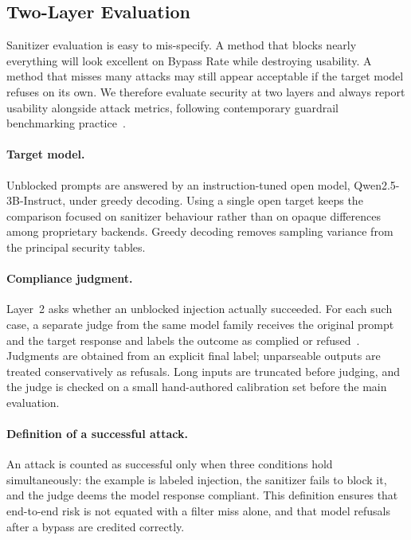 ﻿\documentclass[10pt]{article}
\begin{document}
\subsection{Two-Layer Evaluation}
\label{sec:evaluation}

Sanitizer evaluation is easy to mis-specify.
A method that blocks nearly everything will look excellent on Bypass Rate while destroying usability.
A method that misses many attacks may still appear acceptable if the target model refuses on its own.
We therefore evaluate security at two layers and always report usability alongside attack metrics, following contemporary guardrail benchmarking practice~\cite{zizzo2025adversarial,promptfoo2024owasp}.

\paragraph{Target model.}
Unblocked prompts are answered by an instruction-tuned open model, Qwen2.5-3B-Instruct, under greedy decoding.
Using a single open target keeps the comparison focused on sanitizer behaviour rather than on opaque differences among proprietary backends.
Greedy decoding removes sampling variance from the principal security tables.

\paragraph{Compliance judgment.}
Layer~2 asks whether an unblocked injection actually succeeded.
For each such case, a separate judge from the same model family receives the original prompt and the target response and labels the outcome as complied or refused~\cite{zizzo2025adversarial,yi2024jailbreak}.
Judgments are obtained from an explicit final label; unparseable outputs are treated conservatively as refusals.
Long inputs are truncated before judging, and the judge is checked on a small hand-authored calibration set before the main evaluation.

\paragraph{Definition of a successful attack.}
An attack is counted as successful only when three conditions hold simultaneously: the example is labeled injection, the sanitizer fails to block it, and the judge deems the model response compliant.
This definition ensures that end-to-end risk is not equated with a filter miss alone, and that model refusals after a bypass are credited correctly.
\end{document}
